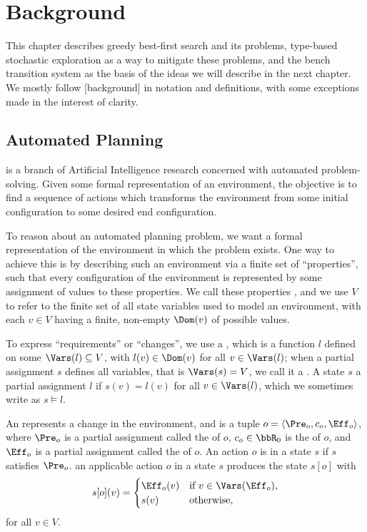 \chapter{Background}

This chapter describes greedy best-first search and its problems, type-based stochastic exploration as a way to mitigate these problems, and the bench transition system as the basis of the ideas we will describe in the next chapter. We mostly follow [background] in notation and definitions, with some exceptions made in the interest of clarity.

\section{Automated Planning}

 is a branch of Artificial Intelligence research concerned with automated problem-solving. Given some formal representation of an environment, the objective is to find a sequence of actions which transforms the environment from some initial configuration to some desired end configuration.


To reason about an automated planning problem, we want a formal representation of the environment in which the problem exists. One way to achieve this is by describing such an environment via a finite set of ``properties'', such that every configuration of the environment is represented by some assignment of values to these properties. We call these properties , and we use $V$ to refer to the finite set of all state variables used to model an environment, with each $v\in V$ having a finite, non-empty  $\Dom(v)$ of possible values.

To express ``requirements'' or ``changes'', we use a , which is a function $l$ defined on some  $\Vars(l)\subseteq V$, with $l(v)\in\Dom(v)$ for all $v\in\Vars(l)$; when a partial assignment $s$ defines all variables, that is $\Vars(s)=V$, we call it a . A state $s$  a partial assignment $l$ if $s(v)=l(v)$ for all $v\in\Vars(l)$, which we sometimes write as $s\models l$.

An  represents a change in the environment, and is a tuple $o=\langle\Pre_o,c_o,\Eff_o\rangle$, where $\Pre_o$ is a partial assignment called the  of $o$, $c_o\in\bbR_0$ is the  of $o$, and $\Eff_o$ is a partial assignment called the  of $o$. An action $o$ is  in a state $s$ if $s$ satisfies $\Pre_o$.  an applicable action $o$ in a state $s$ produces the state $s[o]$ with $$s[o](v)=\begin{cases}\Eff_o(v)&\text{if $v\in\Vars(\Eff_o)$,}\\s(v)&\text{otherwise,}\end{cases}$$ for all $v\in V$.

